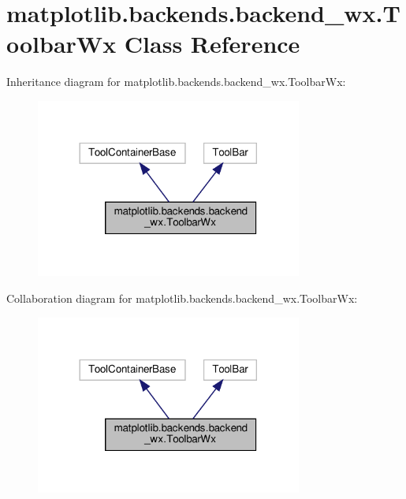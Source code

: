 \hypertarget{classmatplotlib_1_1backends_1_1backend__wx_1_1ToolbarWx}{}\section{matplotlib.\+backends.\+backend\+\_\+wx.\+Toolbar\+Wx Class Reference}
\label{classmatplotlib_1_1backends_1_1backend__wx_1_1ToolbarWx}


Inheritance diagram for matplotlib.\+backends.\+backend\+\_\+wx.\+Toolbar\+Wx\+:
\nopagebreak
\begin{figure}[H]
\begin{center}
\leavevmode
\includegraphics[width=248pt]{classmatplotlib_1_1backends_1_1backend__wx_1_1ToolbarWx__inherit__graph}
\end{center}
\end{figure}


Collaboration diagram for matplotlib.\+backends.\+backend\+\_\+wx.\+Toolbar\+Wx\+:
\nopagebreak
\begin{figure}[H]
\begin{center}
\leavevmode
\includegraphics[width=248pt]{classmatplotlib_1_1backends_1_1backend__wx_1_1ToolbarWx__coll__graph}
\end{center}
\end{figure}
